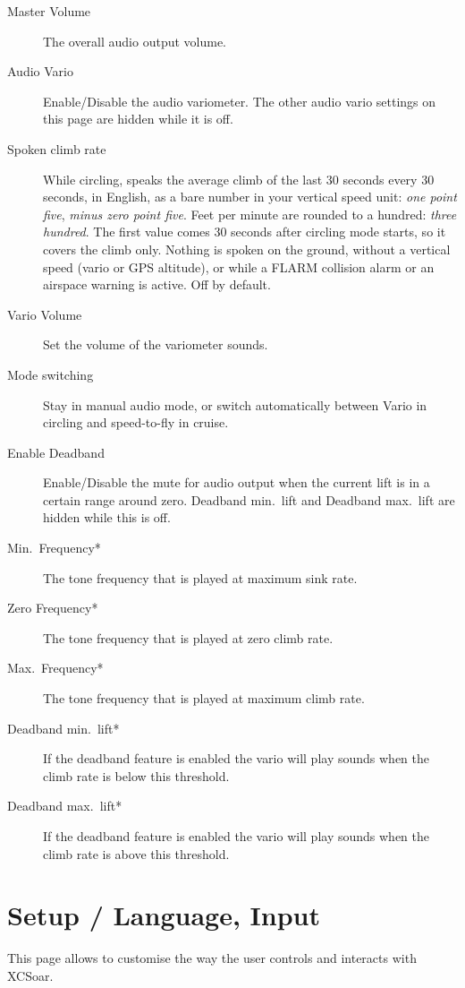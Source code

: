 \begin{description}
\item[Master Volume]  The overall audio output volume.
\item[Audio Vario]  Enable/Disable the audio variometer. The other
  audio vario settings on this page are hidden while it is off.
\item[Spoken climb rate] \label{conf:spokenclimbrate} While circling,
  speaks the average climb of the last 30 seconds every 30 seconds,
  in English, as a bare number in your vertical speed unit: {\em one
  point five}, {\em minus zero point five}.  Feet per minute are
  rounded to a hundred: {\em three hundred}.  The first value comes
  30 seconds after circling mode starts, so it covers the climb
  only.  Nothing is spoken on the ground, without a vertical speed
  (vario or GPS altitude), or while a FLARM collision alarm or an
  airspace warning is active.  Off by default.
\item[Vario Volume]  Set the volume of the variometer sounds.
\item[Mode switching]  Stay in manual audio mode, or switch automatically
  between Vario in circling and speed-to-fly in cruise.
\item[Enable Deadband]  Enable/Disable the mute for audio output when the current lift is in a certain range around zero. Deadband min.\ lift and Deadband max.\ lift are hidden while this is off.
\item[Min.\ Frequency*]  The tone frequency that is played at maximum sink rate.
\item[Zero Frequency*]  The tone frequency that is played at zero climb rate.
\item[Max.\ Frequency*]  The tone frequency that is played at maximum climb rate.
\item[Deadband min.\ lift*]  If the deadband feature is enabled the vario will play sounds when the climb rate is below this threshold.
\item[Deadband max.\ lift*]  If the deadband feature is enabled the vario will play sounds when the climb rate is above this threshold.
\end{description}


\section{Setup / Language, Input}\label{sec:interface}

This page allows to customise the way the user controls and interacts with
XCSoar.

